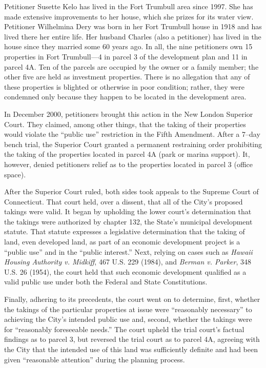 Petitioner Susette Kelo has lived in the Fort Trumbull area since 1997. She has
made extensive improvements to her house, which she prizes for its water view.
Petitioner Wilhelmina Dery was born in her Fort Trumbull house in 1918 and has
lived there her entire life. Her husband Charles (also a petitioner) has lived
in the house since they married some 60 years ago. In all, the nine petitioners
own 15 properties in Fort Trumbull---4 in parcel 3 of the development plan and
11 in parcel 4A. Ten of the parcels are occupied by the owner or a family
member; the other five are held as investment properties. There is no allegation
that any of these properties is blighted or otherwise in poor condition; rather,
they were condemned only because they happen to be located in the development
area.

In December 2000, petitioners brought this action in the New London Superior
Court. They claimed, among other things, that the taking of their properties
would violate the ``public use'' restriction in the Fifth Amendment. After a
7--day bench trial, the Superior Court granted a permanent restraining order
prohibiting the taking of the properties located in parcel 4A (park or marina
support). It, however, denied petitioners relief as to the properties located in
parcel 3 (office space). 

After the Superior Court ruled, both sides took appeals to the Supreme Court of
Connecticut. That court held, over a dissent, that all of the City's proposed
takings were valid. It began by upholding the lower court's determination that
the takings were authorized by chapter 132, the State's municipal development
statute. That statute expresses a legislative determination that the taking of
land, even developed land, as part of an economic development project is a
``public use'' and in the ``public interest.'' Next, relying on cases such as
\textit{Hawaii Housing Authority v. Midkiff}, 467 U.S. 229 (1984), and
\textit{Berman v. Parker}, 348 U.S. 26 (1954), the court held that such economic
development qualified as a valid public use under both the Federal and State
Constitutions. 

Finally, adhering to its precedents, the court went on to determine, first,
whether the takings of the particular properties at issue were ``reasonably
necessary'' to achieving the City's intended public use and, second, whether the
takings were for ``reasonably foreseeable needs.'' The court upheld the trial
court's factual findings as to parcel 3, but reversed the trial court as to
parcel 4A, agreeing with the City that the intended use of this land was
sufficiently definite and had been given ``reasonable attention'' during the
planning process. 

